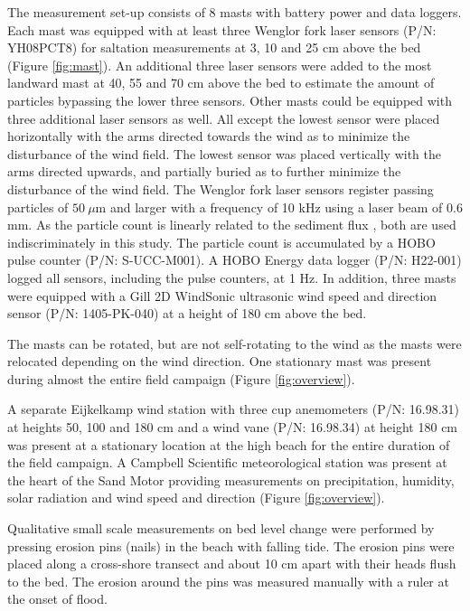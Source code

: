 The measurement set-up consists of 8 masts with battery power and data
loggers. Each mast was equipped with at least three Wenglor fork laser
sensors (P/N: YH08PCT8) for saltation measurements at 3, 10 and 25 cm
above the bed (Figure \ref{fig:mast}). An additional three laser
sensors were added to the most landward mast at 40, 55 and 70 cm above
the bed to estimate the amount of particles bypassing the lower three
sensors. Other masts could be equipped with three additional laser
sensors as well. All except the lowest sensor were placed horizontally
with the arms directed towards the wind as to minimize the disturbance
of the wind field. The lowest sensor was placed vertically with the
arms directed upwards, and partially buried as to further minimize the
disturbance of the wind field. The Wenglor fork laser sensors register
passing particles of $50 ~ \mu \mathrm{m}$ and larger with a frequency
of 10 kHz using a laser beam of 0.6 mm. As the particle count is
linearly related to the sediment flux \citep{Hugenholtz2011}, both are
used indiscriminately in this study. The particle count is accumulated
by a HOBO pulse counter (P/N: S-UCC-M001). A HOBO Energy data logger
(P/N: H22-001) logged all sensors, including the pulse counters, at 1
Hz. In addition, three masts were equipped with a Gill 2D WindSonic
ultrasonic wind speed and direction sensor (P/N: 1405-PK-040) at a
height of 180 cm above the bed.

The masts can be rotated, but are not self-rotating to the wind as the
masts were relocated depending on the wind direction.  One stationary
mast was present during almost the entire field campaign (Figure
\ref{fig:overview}).

A separate Eijkelkamp wind station with three cup anemometers (P/N:
16.98.31) at heights 50, 100 and 180 cm and a wind vane (P/N:
16.98.34) at height 180 cm was present at a stationary location at the
high beach for the entire duration of the field campaign. A Campbell
Scientific meteorological station was present at the heart of the Sand
Motor providing measurements on precipitation, humidity, solar
radiation and wind speed and direction (Figure \ref{fig:overview}).

Qualitative small scale measurements on bed level change were
performed by pressing erosion pins (nails) in the beach with falling
tide. The erosion pins were placed along a cross-shore transect and
about 10 cm apart with their heads flush to the bed. The erosion
around the pins was measured manually with a ruler at the onset of
flood.

